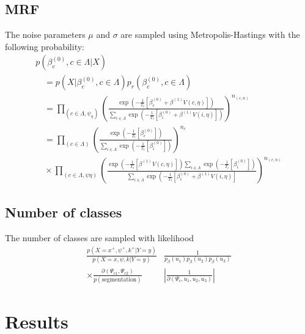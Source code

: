 \documentclass[11pt]{article}
\begin{document}
\subsection{MRF}
The noise parameters $\mu$ and $\sigma$ are sampled using Metropolis-Hastings with the following probability:
\begin{equation}
\begin{array}{l}
p\left(\beta_{c}^{(0)}, c \in \Lambda | X\right) \\
\quad=p\left(X | \beta_{c}^{(0)}, c \in \Lambda\right) p_{r}\left(\beta_{c}^{(0)}, c \in \Lambda\right) \\
\quad=\prod_{\left(c \in \Lambda, \psi_{\eta}\right)}\left(\frac{\exp \left(-\frac{1}{T_{t}}\left[\beta_{c}^{(0)}+\beta^{(1)} V(c, \eta)\right]\right)}{\sum_{i \in \Lambda} \exp \left(-\frac{1}{T_{t}}\left[\beta_{i}^{(0)}+\beta^{(1)} V(i, \eta)\right]\right)}\right)^{n_{(c, n)}} \\
\quad=\prod_{(c \in \Lambda)}\left(\frac{\exp \left(-\frac{1}{T_{t}}\left[\beta_{c}^{(0)}\right]\right)}{\sum_{i \in \Lambda} \exp \left(-\frac{1}{T_{t}}\left[\beta_{i}^{(0)}\right]\right)}\right)^{n_{c}} \\
\quad \times \prod_{(c \in \Lambda, \psi \eta)}\left(\frac{\exp \left(-\frac{1}{T_{t}}\left[\beta^{(1)} V(c, \eta)\right]\right) \sum_{i \in \Lambda} \exp \left(-\frac{1}{T_{t}}\left[\beta_{i}^{(0)}\right]\right)}{\sum_{i \in \Lambda} \exp \left(-\frac{1}{T_{t}}\left[\beta_{i}^{(0)}+\beta^{(1)} V(i, \eta)\right]\right.}\right)^{n_{(c, n)}}
\end{array}
\end{equation}

\subsection{Number of classes}
The number of classes are sampled with likelihood
\begin{equation}
\begin{aligned}
\frac{p\left(X=x^{+}, \psi^{+}, k^{+} | Y=y\right)}{p(X=x, \psi, k | Y=y)} & \frac{1}{p_{\beta}\left(u_{1}\right) p_{\beta}\left(u_{2}\right) p_{\beta}\left(u_{3}\right)} \\
\times \frac{\partial\left(\Psi_{c 1}, \Psi_{c 2}\right)}{p(\text {segmentation})} &\left|\frac{1}{\partial\left(\Psi_{c}, u_{1}, u_{2}, u_{3}\right)}\right|
\end{aligned}
\end{equation}

\section{Results}
\end{document}
